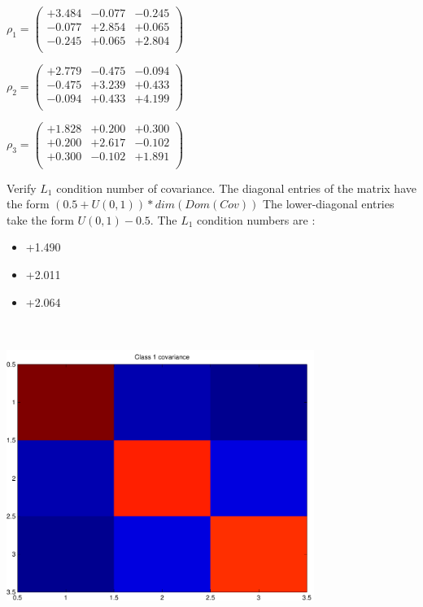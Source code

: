 \documentclass[9pt]{article}
\theoremstyle{plain}
\theoremstyle{definition}
\theoremstyle{remark}
\numberwithin{equation}{section}
\begin{document}
$\rho_1 = \left(
\begin{array}{
ccc}
+3.484 & -0.077 & -0.245 \\
-0.077 & +2.854 & +0.065 \\
-0.245 & +0.065 & +2.804 \\
\end{array}
\right)$ \newline 

$\rho_2 = \left(
\begin{array}{
ccc}
+2.779 & -0.475 & -0.094 \\
-0.475 & +3.239 & +0.433 \\
-0.094 & +0.433 & +4.199 \\
\end{array}
\right)$ \newline 

$\rho_3 = \left(
\begin{array}{
ccc}
+1.828 & +0.200 & +0.300 \\
+0.200 & +2.617 & -0.102 \\
+0.300 & -0.102 & +1.891 \\
\end{array}
\right)$ \newline 

Verify $L_1$ condition number of covariance. The diagonal entries of the matrix have the form $(0.5 + U(0,1) )*dim(Dom(Cov))$
The lower-diagonal entries take the form $U(0,1) - 0.5$. 
The $L_1$ condition numbers are :
\begin{itemize}
\item +1.490
\item +2.011
\item +2.064
\end{itemize}
\includegraphics[width=10.0cm,height=10.0cm]{rv1_corr.pdf}
\end{document}
